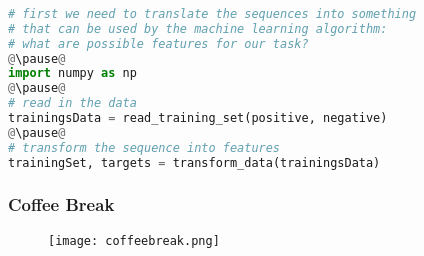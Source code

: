 \begin{frame}[c,fragile]\frametitle{}
  \begin{lstlisting}[language=Python]
# first we need to translate the sequences into something
# that can be used by the machine learning algorithm:
# what are possible features for our task?
@\pause@
import numpy as np
@\pause@
# read in the data
trainingsData = read_training_set(positive, negative)
@\pause@
# transform the sequence into features
trainingSet, targets = transform_data(trainingsData)
  \end{lstlisting}
\end{frame}

\beginbackup

\begin{frame}[c]\frametitle{Coffee Break}
  \begin{figure}[htbp]
    \centering
    \texttt{[image: coffeebreak.png]}
  \end{figure}
\end{frame}

\backupend

